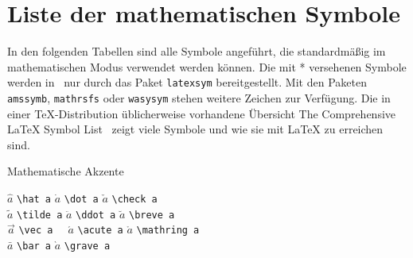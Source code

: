 

\section{Liste der mathematischen Symbole}  \label{symbols}

In den folgenden Tabellen sind alle Symbole angeführt, die
standardmäßig im mathematischen Modus verwendet werden
können.  Die mit * versehenen Symbole werden
in \LaTeXe\ nur durch das Paket \texttt{latexsym} bereitgestellt. 
Mit den Paketen \texttt{amssymb}, 
\texttt{mathrsfs} oder \texttt{wasysym} stehen weitere Zeichen zur 
Verfügung. Die in einer \TeX-Distribution üblicherweise vorhandene Übersicht { The Comprehensive \LaTeX{} Symbol List}~\cite{symbols} zeigt viele Symbole und wie sie mit \LaTeX{} zu erreichen sind.


\begin{table}[hbp]
\caption{Mathematische Akzente}  \label{mathakz}
\begin{symbols}
$\hat a$    \> \lstinline|\hat a|   \> $\dot a$   \> \lstinline|\dot a|   \> $\check a$    \> \lstinline|\check a|    \\ 
$\tilde a$  \> \lstinline|\tilde a| \> $\ddot a$  \> \lstinline|\ddot a|  \> $\breve a$    \> \lstinline|\breve a|    \\
$\vec a$    \> \lstinline|\vec a  | \> $\acute a$ \> \lstinline|\acute a| \> $\mathring a$ \> \lstinline|\mathring a| \\
$\bar a$    \> \lstinline|\bar a|   \> $\grave a$ \> \lstinline|\grave a| \\
\end{symbols}
\end{table}

